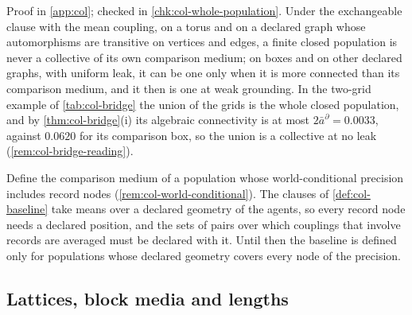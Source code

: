 Proof in \cref{app:col}; checked in \cref{chk:col-whole-population}. Under the exchangeable clause with the mean coupling, on a torus and on a declared graph whose automorphisms are transitive on vertices and edges, a finite closed population is never a collective of its own comparison medium; on boxes and on other declared graphs, with uniform leak, it can be one only when it is more connected than its comparison medium, and it then is one at weak grounding. In the two-grid example of \cref{tab:col-bridge} the union of the grids is the whole closed population, and by \cref{thm:col-bridge}(i) its algebraic connectivity is at most $2\bar a^\partial=0.0033$, against $0.0620$ for its comparison box, so the union is a collective at no leak (\cref{rem:col-bridge-reading}).

\begin{openproblem}\label{open:col-records-baseline}
Define the comparison medium of a population whose world-conditional precision includes record nodes (\cref{rem:col-world-conditional}). The clauses of \cref{def:col-baseline} take means over a declared geometry of the agents, so every record node needs a declared position, and the sets of pairs over which couplings that involve records are averaged must be declared with it. Until then the baseline is defined only for populations whose declared geometry covers every node of the precision.
\end{openproblem}

\subsection{Lattices, block media and lengths}\label{sup:col-lattices-block-media-and-lengths}

